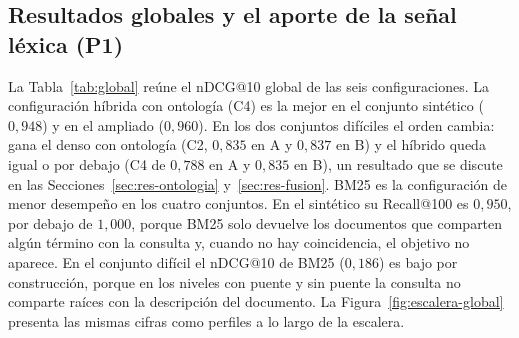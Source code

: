\documentclass[11pt,letterpaper]{article}
\numberwithin{equation}{section}
\begin{document}
\subsection{Resultados globales y el aporte de la señal léxica (P1)}
\label{sec:res-global}
La Tabla~\ref{tab:global} reúne el nDCG@10 global de las seis configuraciones. La configuración híbrida con ontología (C4) es la mejor en el conjunto sintético ($0{,}948$) y en el ampliado ($0{,}960$). En los dos conjuntos difíciles el orden cambia: gana el denso con ontología (C2, $0{,}835$ en A y $0{,}837$ en B) y el híbrido queda igual o por debajo (C4 de $0{,}788$ en A y $0{,}835$ en B), un resultado que se discute en las Secciones~\ref{sec:res-ontologia} y~\ref{sec:res-fusion}. BM25 es la configuración de menor desempeño en los cuatro conjuntos. En el sintético su Recall@100 es $0{,}950$, por debajo de $1{,}000$, porque BM25 solo devuelve los documentos que comparten algún término con la consulta y, cuando no hay coincidencia, el objetivo no aparece. En el conjunto difícil el nDCG@10 de BM25 ($0{,}186$) es bajo por construcción, porque en los niveles con puente y sin puente la consulta no comparte raíces con la descripción del documento. La Figura~\ref{fig:escalera-global} presenta las mismas cifras como perfiles a lo largo de la escalera.
\end{document}
